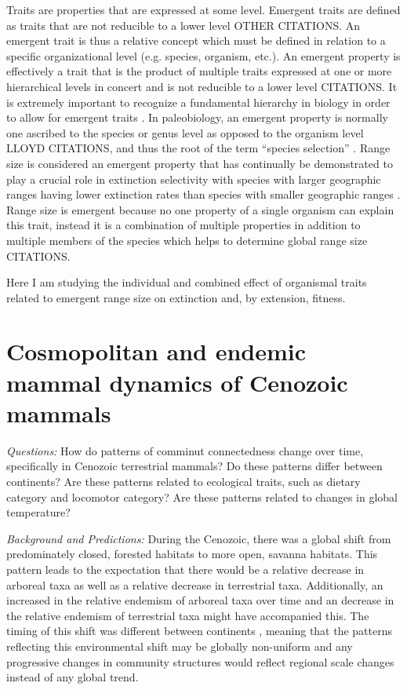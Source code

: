 \documentclass[12pt,letterpaper]{article}
\begin{document}
Traits are properties that are expressed at some level. Emergent traits are defined as traits that are not reducible to a lower level \citep{Jablonski2008a}OTHER CITATIONS. An emergent trait is thus a relative concept which must be defined in relation to a specific organizational level (e.g. species, organism, etc.). An emergent property is effectively a trait that is the product of multiple traits expressed at one or more hierarchical levels in concert and is not reducible to a lower level \citep{Jablonski2008a}CITATIONS. It is extremely important to recognize a fundamental hierarchy in biology in order to allow for emergent traits \citet{Vrba1984}. In paleobiology, an emergent property is normally one ascribed to the species or genus level as opposed to the organism level \citep{Grantham1995,Jablonski2008a,Vrba1983} LLOYD CITATIONS, and thus the root of the term ``species selection'' \citep{Jablonski2008a}. Range size is considered an emergent property that has continually be demonstrated to play a crucial role in extinction selectivity with species with larger geographic ranges having lower extinction rates than species with smaller geographic ranges \citep{Jablonski1986,Harnik2013,Nurnberg2013a}. Range size is emergent because no one property of a single organism can explain this trait, instead it is a combination of multiple properties in addition to multiple members of the species which helps to determine global range size CITATIONS.

Here I am studying the individual and combined effect of organismal traits related to emergent range size on extinction and, by extension, fitness.

\section{Cosmopolitan and endemic mammal dynamics of Cenozoic mammals}

\textit{Questions:} How do patterns of comminut connectedness change over time, specifically in Cenozoic terrestrial mammals? Do these patterns differ between continents? Are these patterns related to ecological traits, such as dietary category and locomotor category? Are these patterns related to changes in global temperature?

\textit{Background and Predictions:}
During the Cenozoic, there was a global shift from predominately closed, forested habitats to more open, savanna habitats. This pattern leads to the expectation that there would be a relative decrease in arboreal taxa as well as a relative decrease in terrestrial taxa. Additionally, an increased in the relative endemism of arboreal taxa over time and an decrease in the relative endemism of terrestrial taxa might have accompanied this. The timing of this shift was different between continents \citep{Stromberg2005,Stromberg2013}, meaning that the patterns reflecting this environmental shift may be globally non-uniform and any progressive changes in community structures would reflect regional scale changes instead of any global trend.
\end{document}
